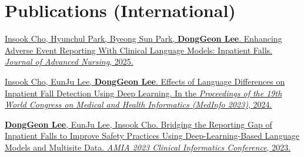 \documentclass[letterpaper,11pt]{article}
\begin{document}
    \section{Publications (International)}
    \begin{enumerate}[noitemsep, leftmargin=*,label={[\arabic*]}]
        \item \href{https://doi.org/10.1111/jan.16812}{Insook Cho, Hyunchul Park, Byeong Sun Park, \textbf{DongGeon Lee}. Enhancing Adverse Event Reporting With Clinical Language Models: Inpatient Falls.  \textit{Journal of Advanced Nursing}, 2025.}
        
        \item \href{https://pubmed.ncbi.nlm.nih.gov/38426881/}{Insook Cho, EunJu Lee, \textbf{DongGeon Lee}. Effects of Language Differences on Inpatient Fall Detection Using Deep Learning. In the \textit{Proceedings of the 19th World Congress on Medical and Health Informatics (MedInfo 2023)}, 2024.}
        
        \item \href{https://bit.ly/cic23s47}{\textbf{DongGeon Lee}, EunJu Lee, Insook Cho. Bridging the Reporting Gap of Inpatient Falls to Improve Safety Practices Using Deep-Learning-Based Language Models and Multisite Data. \textit{AMIA 2023 Clinical Informatics Conference}, 2023.}
    \end{enumerate}
        


\end{document}

